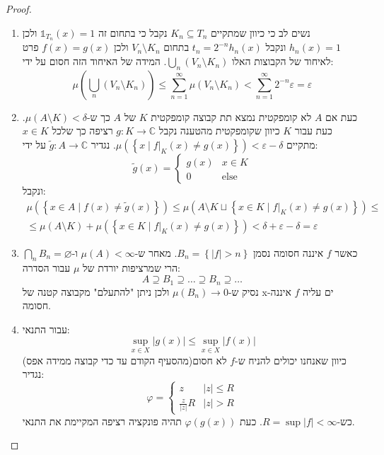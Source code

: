 \documentclass{tstextbook}
\begin{document}
\begin{proof}
\begin{enumerate}
    \item נשים לב כי כיוון שמתקיים \(K_{n}\subseteq T_{n}\) נקבל כי בתחום זה \(\mathbb{1}_{T_{n}}(x)=1\) ולכן \(h_{n}(x)=1\) ונקבל \(t_{n}=2^{-n}h_{n}(x)\) בתחום \(V_{n}\setminus K_{n}\) ולכן \(f(x)=g(x)\) פרט לאיחוד של הקבוצות האלו \(\bigcup_{n}\left( V_{n}\setminus K_{n} \right)\). המידה של האיחוד הזה חסום על ידי: 
$$\mu \left( \bigcup_{n}\left( V_{n}\setminus K_{n} \right) \right)\leq\sum_{n=1}^{\infty}\mu\left( V_{n}\setminus K_{n} \right)<\sum_{n=1}^{\infty}2^{-n}\varepsilon=\varepsilon$$


    \item כעת אם \(A\) לא קומפקטית נמצא תת קבוצה קומפקטית \(K\) של \(A\) כך ש-\(\mu\left( A\setminus K \right)<\delta\). כעת עבור \(K\) כיוון שקומפקטית מהטענה נקבל \(g:K\to \mathbb{C}\) רציפה כך שלכל \(x \in K\) מתקיים \(\mu\left( \left\{  x\mid f|_{K}(x)\neq g(x)  \right\} \right)<\varepsilon-\delta\). נגדיר \(\tilde{g}:A\to \mathbb{C}\) על ידי: 
$$\tilde{g}(x)=\begin{cases}g(x) &  x \in K \\0  & \text{else}
\end{cases}$$
ונקבל:
\begin{gather*}\mu\left( \left\{  x \in A\mid f(x)\neq \tilde{g}(x)  \right\} \right)\leq\mu\left( A\setminus  K \sqcup \left\{  x \in K\mid f|_{K}(x)\neq g(x)  \right\} \right)\leq\\ \leq \mu\left( A\setminus  K \right)+\mu\left( \left\{  x \in K\mid f|_{K}(x)\neq g(x)  \right\} \right)< \delta+\varepsilon-\delta=\varepsilon 
\end{gather*}


    \item כאשר \(f\) איננה חסומה נסמן \(B_{n}=\left\{  \lvert f \rvert>n  \right\}\). מאחר ש-\(\mu(A)< \infty\) ו-\(\bigcap_{n}B_{n}=\varnothing\) הרי שמרציפות יורדת של \(\mu\) עבור הסדרה: 
$$A \supseteq B_{1} \supseteq \dots \supseteq B_{n}\supseteq \dots$$
נסיק ש-\(\mu(B_{n})\to 0\) ולכן ניתן "להתעלם" מקבוצה קטנה של x-ים עליה \(f\) איננה חסומה.


    \item עבור התנאי: 
$$\sup _{x \in X}\lvert g(x) \rvert \leq \sup _{x \in X} \lvert f(x) \rvert $$
כיוון שאנחנו יכולים להניח ש-\(f\) לא חסום(מהסעיף הקודם עד כדי קבוצה ממידה אפס) נגדיר:
$$\varphi = \begin{cases} z  &   \lvert z \rvert\leq R \\\frac{z}{\lvert z \rvert }R & \lvert z \rvert > R 
\end{cases}$$
כש-\(R=\sup\lvert f \rvert<\infty\). כעת \(\varphi(g(x))\) תהיה פונקציה רציפה המקיימת את התנאי.


  \end{enumerate}
\end{proof}
\end{document}
